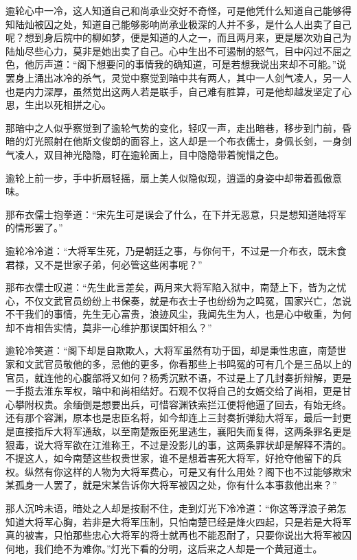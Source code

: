 逾轮心中一冷，这人知道自己和尚承业交好不奇怪，可是他凭什么知道自己能够得知陆灿被囚之处，知道自己能够影响尚承业极深的人并不多，是什么人出卖了自己呢？想到身后院中的柳如梦，便是知道的人之一，而且两月来，更是屡次劝自己为陆灿尽些心力，莫非是她出卖了自己。心中生出不可遏制的怒气，目中闪过不屈之色，他厉声道：“阁下想要问的事情我的确知道，可是若想我说出来却不可能。”说罢身上涌出冰冷的杀气，灵觉中察觉到暗中共有两人，其中一人剑气凌人，另一人也是内力深厚，虽然觉出这两人若是联手，自己难有胜算，可是他却越发坚定了心思，生出以死相拼之心。

那暗中之人似乎察觉到了逾轮气势的变化，轻叹一声，走出暗巷，移步到门前，昏暗的灯光照射在他斯文俊朗的面容上，这人却是一个布衣儒士，身佩长剑，一身剑气凌人，双目神光隐隐，盯在逾轮面上，目中隐隐带着惋惜之色。

逾轮上前一步，手中折扇轻摇，扇上美人似隐似现，逍遥的身姿中却带着孤傲意味。

那布衣儒士抱拳道：“宋先生可是误会了什么，在下并无恶意，只是想知道陆将军的情形罢了。”

逾轮冷冷道：“大将军生死，乃是朝廷之事，与你何干，不过是一介布衣，既未食君禄，又不是世家子弟，何必管这些闲事呢？”

那布衣儒士叹道：“先生此言差矣，两月来大将军陷入狱中，南楚上下，皆为之忧心，不仅文武官员纷纷上书保奏，就是布衣士子也纷纷为之鸣冤，国家兴亡，怎说不干我们的事情，先生无心富贵，浪迹风尘，我闻先生为人，也是心中敬重，为何却不肯相告实情，莫非一心维护那误国奸相么？”

逾轮冷笑道：“阁下却是自欺欺人，大将军虽然有功于国，却是秉性忠直，南楚世家和文武官员敬他的多，忌他的更多，你看那些上书鸣冤的可有几个是三品以上的官员，就连他的心腹部将又如何？杨秀沉默不语，不过是上了几封奏折辩解，更是一手揽去淮东军权，暗中和尚相结好。石观不仅将自己的女婿交给了尚相，更是甘心攀附权贵。余缅倒是想要出兵，可惜容渊铁索拦江便将他逼了回去，有始无终。还有那个容渊，原本也是忠臣名将，如今却连上三封奏折弹劾大将军，最后一封更是直接指斥大将军通敌，以至南楚叛臣死里逃生，襄阳失而复得，这两条罪名更是狠毒，说大将军欲在江淮称王，不过是没影儿的事，这两条罪状却是解释不清的。不提这人，如今南楚这些权贵世家，谁不是想着害死大将军，好抢夺他留下的兵权。纵然有你这样的人物为大将军费心，可是又有什么用处？阁下也不过能够欺宋某孤身一人罢了，就是宋某告诉你大将军被囚之处，你有什么本事救他出来？”

那人沉吟未语，暗处之人却是按耐不住，走到灯光下冷冷道：“你这等浮浪子弟怎知道大将军心胸，若非是大将军压制，只怕南楚已经是烽火四起，只是若是大将军真的被害，只怕那些忠心大将军的将士就再也不能忍耐了，只要你说出大将军被囚何地，我们绝不为难你。”灯光下看的分明，这后来之人却是一个黄冠道士。

